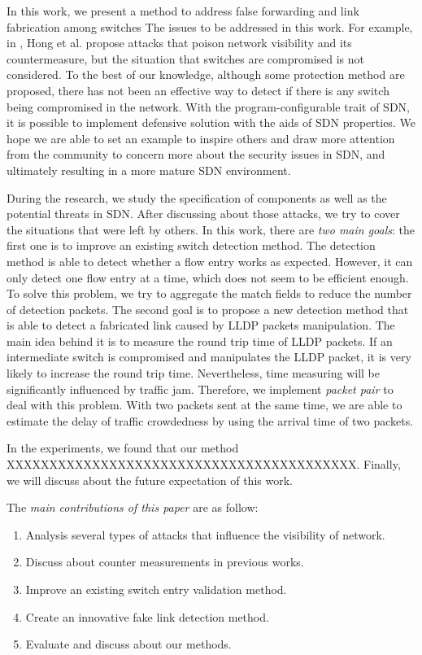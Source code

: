 In this work, we present a method to address false forwarding and link fabrication among switches {\color{red} The issues to be addressed in this work}. For example, in \cite{HXWG15}, Hong et al. propose attacks that poison network visibility and its countermeasure, but the situation that switches are compromised is not considered. To the best of our knowledge, although some protection method are proposed, there has not been an effective way to detect if there is any switch being compromised in the network. With the program-configurable trait of SDN, it is possible to implement defensive solution with the aids of SDN properties. We hope we are able to set an example to inspire others and draw more attention from the community to concern more about the security issues in SDN, and ultimately resulting in a more mature SDN environment.

During the research, we study the specification of components as well as the potential threats in SDN. After discussing about those attacks, we try to cover the situations that were left by others. In this work, there are \emph{two main goals}: the first one is to improve an existing switch detection method. The detection method is able to detect whether a flow entry works as expected. However, it can only detect one flow entry at a time, which does not seem to be efficient enough. To solve this problem, we try to aggregate the match fields to reduce the number of detection packets. The second goal is to propose a new detection method that is able to detect a fabricated link caused by LLDP packets manipulation. The main idea behind it is to measure the round trip time of LLDP packets. If an intermediate switch is compromised and manipulates the LLDP packet, it is very likely to increase the round trip time. Nevertheless, time measuring will be significantly influenced by traffic jam. Therefore, we implement \textit{packet pair} to deal with this problem. With two packets sent at the same time, we are able to estimate the delay of traffic crowdedness by using the arrival time of two packets.


In the experiments, we found that our method XXXXXXXXXXXXXXXXXXXXXXXXXXXXXXXXXXXXXXXXX. Finally, we will discuss about the future expectation of this work.

The \emph{main contributions of this paper} are as follow:

\begin{enumerate}
\item
Analysis several types of attacks that influence the visibility of network.
\item
Discuss about counter measurements in previous works.
\item
Improve an existing switch entry validation method.
\item
Create an innovative fake link detection method.
\item
Evaluate and discuss about our methods.
\end{enumerate}

